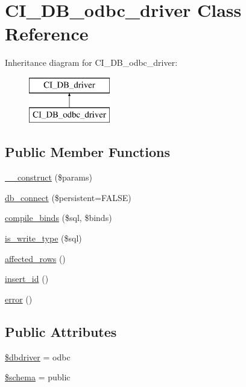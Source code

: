 \hypertarget{class_c_i___d_b__odbc__driver}{}\section{C\+I\+\_\+\+D\+B\+\_\+odbc\+\_\+driver Class Reference}
\label{class_c_i___d_b__odbc__driver}
Inheritance diagram for C\+I\+\_\+\+D\+B\+\_\+odbc\+\_\+driver\+:\begin{figure}[H]
\begin{center}
\leavevmode
\includegraphics[height=2.000000cm]{class_c_i___d_b__odbc__driver}
\end{center}
\end{figure}
\subsection*{Public Member Functions}
\begin{DoxyCompactItemize}
\item 
\mbox{\hyperlink{class_c_i___d_b__odbc__driver_a9162320adff1a1a4afd7f2372f753a3e}{\+\_\+\+\_\+construct}} (\$params)
\item 
\mbox{\hyperlink{class_c_i___d_b__odbc__driver_a52bf595e79e96cc0a7c907a9b45aeb4d}{db\+\_\+connect}} (\$persistent=F\+A\+L\+SE)
\item 
\mbox{\hyperlink{class_c_i___d_b__odbc__driver_a0ba381d2e9078472bd0167e75cc8033c}{compile\+\_\+binds}} (\$sql, \$binds)
\item 
\mbox{\hyperlink{class_c_i___d_b__odbc__driver_af435df5703c238769d6d16fde6d51182}{is\+\_\+write\+\_\+type}} (\$sql)
\item 
\mbox{\hyperlink{class_c_i___d_b__odbc__driver_a77248aaad33eb132c04cc4aa3f4bc8cb}{affected\+\_\+rows}} ()
\item 
\mbox{\hyperlink{class_c_i___d_b__odbc__driver_a933f2cde8dc7f87875e257d0a4902e99}{insert\+\_\+id}} ()
\item 
\mbox{\hyperlink{class_c_i___d_b__odbc__driver_a43b8d30b879d4f09ceb059b02af2bc02}{error}} ()
\end{DoxyCompactItemize}
\subsection*{Public Attributes}
\begin{DoxyCompactItemize}
\item 
\mbox{\hyperlink{class_c_i___d_b__odbc__driver_a0cde2a16322a023d040aa7f725877597}{\$dbdriver}} = \textquotesingle{}odbc\textquotesingle{}
\item 
\mbox{\hyperlink{class_c_i___d_b__odbc__driver_a83022b1d70799d2bde3d64dca9cb40ee}{\$schema}} = \textquotesingle{}public\textquotesingle{}
\end{DoxyCompactItemize}

